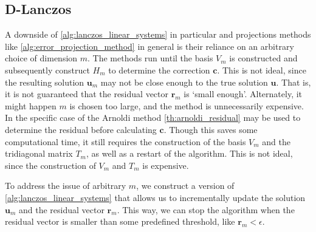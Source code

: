 \subsection{D-Lanczos} 
A downside of \cref{alg:lanczos_linear_systems} in particular and projections methods like \cref{alg:error_projection_method} in general is their reliance on an arbitrary choice of dimension $m$. The methods run until the basis $V_m$ is constructed and subsequently construct $H_m$ to determine the correction $\mathbf{c}$. This is not ideal, since the resulting solution $\mathbf{u}_m$ may not be close enough to the true solution $\mathbf{u}$. That is, it is not guaranteed that the residual vector $\mathbf{r}_m$ is `small enough'. Alternately, it might happen $m$ is chosen too large, and the method is unnecessarily expensive. In the specific case of the Arnoldi method \cref{th:arnoldi_residual} may be used to determine the residual before calculating $\mathbf{c}$. Though this saves some computational time, it still requires the construction of the basis $V_m$ and the tridiagonal matrix $T_m$, as well as a restart of the algorithm. This is not ideal, since the construction of $V_m$ and $T_m$ is expensive.

To address the issue of arbitrary $m$, we construct a version of \cref{alg:lanczos_linear_systems} that allows us to incrementally update the solution $\mathbf{u}_m$ and the residual vector $\mathbf{r}_m$. This way, we can stop the algorithm when the residual vector is smaller than some predefined threshold, like $\mathbf{r}_m < \epsilon$. 

